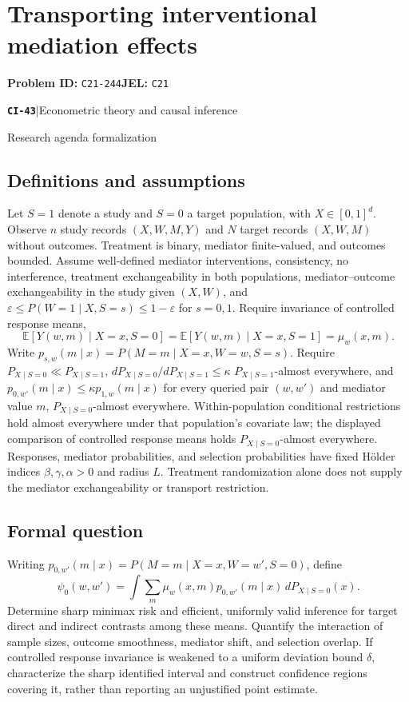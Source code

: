 \documentclass[11pt,a4paper]{article}
\newcommand{\E}{\mathbb E}
\newcommand{\entrymeta}[3]{{\sffamily\small\color{muted}\textbf{\texttt{#1}}\quad|\quad #2\par #3\par}}
\begin{document}
\section*{Transporting interventional mediation effects}
\textbf{Problem ID:} \texttt{C21-244}\quad \textbf{JEL:} \texttt{C21}\par
\label{problem:OP-0522}
\label{beyond:CI-43}
\entrymeta{CI-43}{Econometric theory and causal inference}{Research agenda formalization}
\subsection*{Definitions and assumptions}
Let $S=1$ denote a study and $S=0$ a target population, with $X\in[0,1]^d$. Observe $n$ study records $(X,W,M,Y)$ and $N$ target records $(X,W,M)$ without outcomes. Treatment is binary, mediator finite-valued, and outcomes bounded. Assume well-defined mediator interventions, consistency, no interference, treatment exchangeability in both populations, mediator--outcome exchangeability in the study given $(X,W)$, and $\varepsilon\leq P(W=1\mid X,S=s)\leq1-\varepsilon$ for $s=0,1$. Require invariance of controlled response means,
\[
 \E[Y(w,m)\mid X=x,S=0]=\E[Y(w,m)\mid X=x,S=1]=\mu_w(x,m).
\]
Write $p_{s,w}(m\mid x)=P(M=m\mid X=x,W=w,S=s)$. Require $P_{X\mid S=0}\ll P_{X\mid S=1}$, $dP_{X\mid S=0}/dP_{X\mid S=1}\leq\kappa$ $P_{X\mid S=1}$-almost everywhere, and $p_{0,w'}(m\mid x)\leq\kappa p_{1,w}(m\mid x)$ for every queried pair $(w,w')$ and mediator value $m$, $P_{X\mid S=0}$-almost everywhere. Within-population conditional restrictions hold almost everywhere under that population's covariate law; the displayed comparison of controlled response means holds $P_{X\mid S=0}$-almost everywhere. Responses, mediator probabilities, and selection probabilities have fixed H\"older indices $\beta,\gamma,\alpha>0$ and radius $L$. Treatment randomization alone does not supply the mediator exchangeability or transport restriction.
\subsection*{Formal question}
Writing $p_{0,w'}(m\mid x)=P(M=m\mid X=x,W=w',S=0)$, define
\[
 \psi_0(w,w')=\int\sum_m\mu_w(x,m)p_{0,w'}(m\mid x)\,dP_{X\mid S=0}(x).
\]
Determine sharp minimax risk and efficient, uniformly valid inference for target direct and indirect contrasts among these means. Quantify the interaction of sample sizes, outcome smoothness, mediator shift, and selection overlap. If controlled response invariance is weakened to a uniform deviation bound $\delta$, characterize the sharp identified interval and construct confidence regions covering it, rather than reporting an unjustified point estimate.
\end{document}
